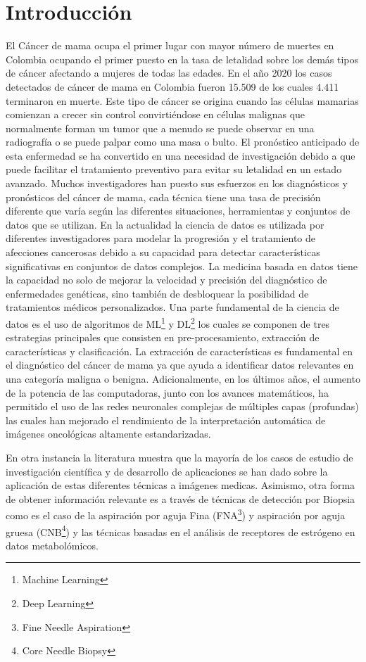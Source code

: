 \section*{Introducción}
El Cáncer de mama ocupa el primer lugar con mayor número de muertes en Colombia ocupando el primer puesto en la tasa de letalidad sobre los demás tipos de cáncer afectando a mujeres de todas las edades. En el año 2020 los casos detectados de cáncer de mama en Colombia fueron 15.509 de los cuales 4.411 terminaron en muerte\cite{InternationalAgencyforResearchonCancer2020}. Este tipo de cáncer se origina cuando las células mamarias comienzan a crecer sin control convirtiéndose en células malignas que normalmente forman un tumor que a menudo se puede observar en una radiografía o se puede palpar como una masa o bulto\cite{Sauer2019}. El pronóstico anticipado de esta enfermedad se ha convertido en una necesidad de investigación debido a que puede facilitar el tratamiento preventivo para evitar su letalidad en un estado avanzado. Muchos investigadores han puesto sus esfuerzos en los diagnósticos y pronósticos del cáncer de mama, cada técnica tiene una tasa de precisión diferente que varía según las diferentes situaciones, herramientas y conjuntos de datos que se utilizan. En la actualidad la ciencia de datos es utilizada por diferentes investigadores para modelar la progresión y el tratamiento de afecciones cancerosas debido a su capacidad para detectar características significativas en conjuntos de datos complejos. La medicina basada en datos tiene la capacidad no solo de mejorar la velocidad y precisión del diagnóstico de enfermedades genéticas, sino también de desbloquear la posibilidad de tratamientos médicos personalizados\cite{Baker2018}. Una parte fundamental de la ciencia de datos es el uso de algoritmos de ML\footnote{Machine Learning} y DL\footnote{Deep Learning} los cuales se componen de tres estrategias principales que consisten en pre-procesamiento, extracción de características y clasificación. La extracción de características es fundamental en el diagnóstico del cáncer de mama ya que ayuda a identificar datos relevantes en una categoría maligna o benigna\cite{Fatima2020}. Adicionalmente, en los últimos años, el aumento de la potencia de las computadoras, junto con los avances matemáticos, ha permitido el uso de las redes neuronales complejas de múltiples capas (profundas) las cuales han mejorado el rendimiento de la interpretación automática de imágenes oncológicas altamente estandarizadas\cite{Mann2020}.

En otra instancia la literatura muestra que la mayoría de los casos de estudio de investigación científica y de desarrollo de aplicaciones se han dado sobre la aplicación de estas diferentes técnicas a imágenes medicas. Asimismo, otra forma de obtener información relevante es a través de técnicas de detección por Biopsia como es el caso de la aspiración por aguja Fina (FNA\footnote{Fine Needle Aspiration}) y aspiración por aguja gruesa (CNB\footnote{Core Needle Biopsy}) y las técnicas basadas en el análisis de receptores de estrógeno en datos metabolómicos. 


